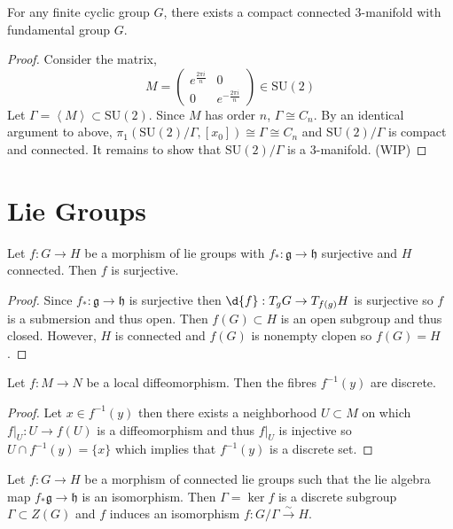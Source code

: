 \documentclass[12pt]{extarticle}
\newcommand{\SU}[1]{\mathrm{SU}(#1)}
\begin{document}
\begin{theorem}
For any finite cyclic group $G$, there exists a compact connected 3-manifold with fundamental group $G$.  
\end{theorem}

\begin{proof}
Consider the matrix,
\[
M = \begin{pmatrix}
e^{\frac{2 \pi i}{n}} & 0 \\
0 & e^{-\frac{2 \pi i}{n}}
\end{pmatrix} \in \SU{2}\]
Let $\Gamma = \left< M \right> \subset \SU{2}$. Since $M$ has order $n$, $\Gamma \cong C_n$. By an identical argument to above, $\pi_1(\SU{2}/\Gamma, [x_0]) \cong \Gamma \cong C_n$ and $\SU{2}/\Gamma$ is compact and connected. It remains to show that $\SU{2}/\Gamma$ is a 3-manifold. (WIP)
\end{proof}

\section{Lie Groups}

\newcommand{\g}{\mathfrak{g}}
\newcommand{\h}{\mathfrak{h}}

\begin{proposition}
Let $f : G \to H$ be a morphism of lie groups with $f_* : \g \to \h$ surjective and $H$ connected. Then $f$ is surjective.
\end{proposition}

\begin{proof}
Since $f_* : \g \to \h$ is surjective then $\d{f} : T_g G \to T_{f(g)} H$ is surjective so $f$ is a submersion and thus open. Then $f(G) \subset H$ is an open subgroup and thus closed. However, $H$ is connected and $f(G)$ is nonempty clopen so $f(G) = H$. 
\end{proof}

\begin{lemma}
Let $f : M \to N$ be a local diffeomorphism. Then the fibres $f^{-1}(y)$ are discrete.
\end{lemma}

\begin{proof}
Let $x \in f^{-1}(y)$ then there exists a neighborhood $U \subset M$ on which $f|_U : U \to f(U)$ is a diffeomorphism and thus $f|_U$ is injective so $U \cap f^{-1}(y) = \{ x \}$ which implies that $f^{-1}(y)$ is a discrete set.
\end{proof}

\begin{proposition}
Let $f : G \to H$ be a morphism of connected lie groups such that the lie algebra map $f_* \g \to \h$ is an isomorphism. Then $\Gamma = \ker{f}$ is a discrete subgroup $\Gamma \subset Z(G)$ and $f$ induces an isomorphism $f : G / \Gamma \xrightarrow{\sim} H$. 
\end{proposition}
\end{document}
